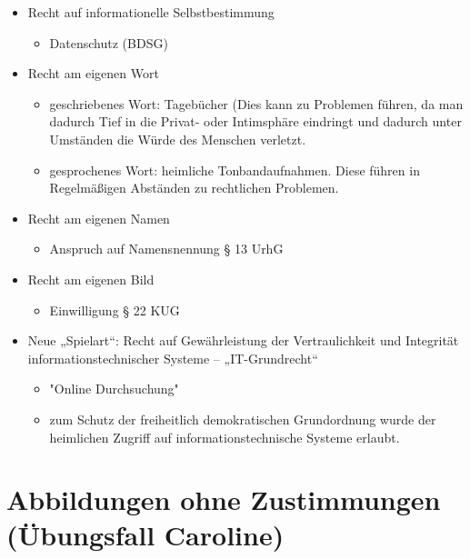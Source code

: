 \begin{itemize}
    \item Recht auf informationelle Selbstbestimmung
    \begin{itemize}
        \item Datenschutz (BDSG)
    \end{itemize}
    \item Recht am eigenen Wort
    \begin{itemize}
        \item geschriebenes Wort: Tagebücher (Dies kann zu Problemen führen, da man dadurch Tief in die Privat- oder Intimsphäre eindringt und dadurch unter Umständen die Würde des Menschen verletzt.
        \item gesprochenes Wort: heimliche Tonbandaufnahmen. Diese führen in Regelmäßigen Abständen zu rechtlichen Problemen. 
    \end{itemize}
    \item Recht am eigenen Namen
    \begin{itemize}
        \item Anspruch auf Namensnennung § 13 UrhG
    \end{itemize}
    \item Recht am eigenen Bild
    \begin{itemize}
        \item Einwilligung § 22 KUG
    \end{itemize}
    \item Neue „Spielart“: Recht auf Gewährleistung der Vertraulichkeit und Integrität informationstechnischer Systeme – „IT-Grundrecht“
    \begin{itemize}
        \item "Online Durchsuchung"
        \item zum Schutz der freiheitlich demokratischen Grundordnung wurde der heimlichen Zugriff auf informationstechnische Systeme erlaubt.
    \end{itemize}
\end{itemize}
%
%
%
\section{Abbildungen ohne Zustimmungen (Übungsfall Caroline)}
